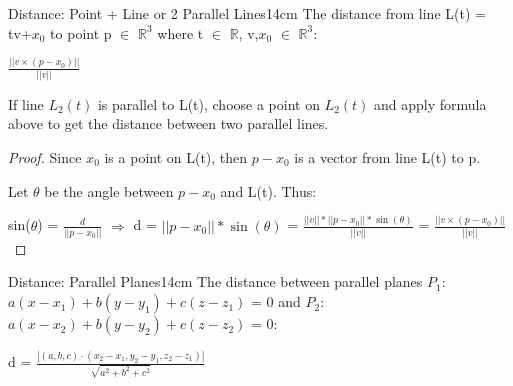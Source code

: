    \vspace{0.5cm}



    \begin{wtheorem}{Distance: Point + Line or 2 Parallel Lines}{14cm}
        The distance from line L(t) = tv+$x_0$ to point p $\in$ $\mathbb{R}^3$
        where t $\in$ $\mathbb{R}$, v,$x_0$ $\in$ $\mathbb{R}^3$:

        \hspace{0.5cm}
        $\frac{||v \times (p - x_0)||}{||v||}$

        If line $L_2(t)$ is parallel to L(t), choose a point on $L_2(t)$
        and apply formula above to get the distance between two parallel lines.
    \end{wtheorem}

    \begin{proof}
        Since $x_0$ is a point on L(t), then
        $p - x_0$ is a vector from line L(t) to p.

        Let $\theta$ be the angle between $p - x_0$
        and L(t). Thus:

        \hspace{0.5cm}
        sin($\theta$) = $\frac{d}{||p - x_0||}$
        \hspace{0.5cm}
        $\Rightarrow$
        \hspace{0.5cm}
        d = $||p - x_0|| * \sin(\theta)$
        = $\frac{||v|| * ||p - x_0|| * \sin(\theta)}{||v||}$
        = $\frac{||v \times (p - x_0)||}{||v||}$
    \end{proof}

    \vspace{0.5cm}



    \begin{wtheorem}{Distance: Parallel Planes}{14cm}
        The distance between parallel planes
        $P_1$: $a(x-x_1) + b(y-y_1) + c(z-z_1)$ = 0
        and $P_2$: $a(x-x_2) + b(y-y_2) + c(z-z_2)$ = 0:

        \hspace{0.5cm}
        d = $\frac{|(a,b,c) \cdot (x_2-x_1,y_2-y_1,z_2-z_1)|}{\sqrt{a^2+b^2+c^2}}$
    \end{wtheorem}

